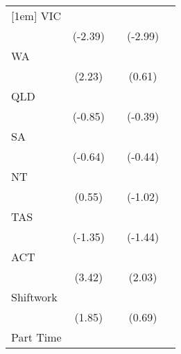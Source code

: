 {\begin{tabular}{l*{4}{c}}
[1em]
VIC                 &            \sym{*}  &                     &            \sym{**} &                     \\
                    &     (-2.39)         &                     &     (-2.99)         &                     \\
[1em]
WA                  &            \sym{*}  &                     &                     &                     \\
                    &      (2.23)         &                     &      (0.61)         &                     \\
[1em]
QLD                 &                     &                     &                     &                     \\
                    &     (-0.85)         &                     &     (-0.39)         &                     \\
[1em]
SA                  &                     &                     &                     &                     \\
                    &     (-0.64)         &                     &     (-0.44)         &                     \\
[1em]
NT                  &                     &                     &                     &                     \\
                    &      (0.55)         &                     &     (-1.02)         &                     \\
[1em]
TAS                 &                     &                     &                     &                     \\
                    &     (-1.35)         &                     &     (-1.44)         &                     \\
[1em]
ACT                 &            \sym{***}&                     &            \sym{*}  &                     \\
                    &      (3.42)         &                     &      (2.03)         &                     \\
[1em]
Shiftwork           &                     &                     &                     &                     \\
                    &      (1.85)         &                     &      (0.69)         &                     \\
[1em]
Part Time           &            \sym{***}&            \sym{***}&                     &            \sym{*}  \\

\end{tabular}}
